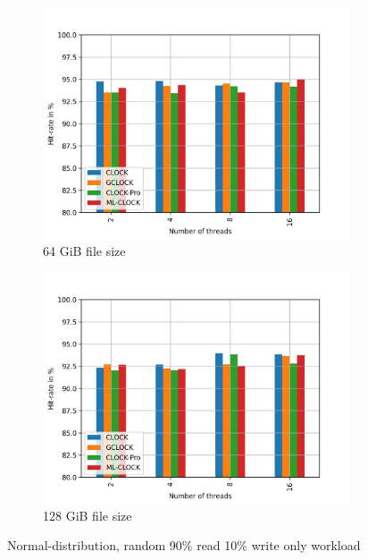 \documentclass[
	12pt,
	a4paper,
	abstract,
	bibliography=totoc,
	chapterprefix,
	headings=openright,
	numbers=endperiod,
	parskip=half,
	twoside,
]{scrreprt}
\begin{document}
\begin{figure}[H]
\begin{subfigure}{0.4\textwidth}
		\includegraphics[width=\textwidth]{multi_64_gb_rw_90to10_normal.jpg}		
		\caption{64 GiB file size}
		\label{fig:rw_90to10 64 normal}
	\end{subfigure}
	\hfill
	\begin{subfigure}{0.4\textwidth}
		\includegraphics[width=\textwidth]{multi_128_gb_rw_90to10_normal.jpg}		
		\caption{128 GiB file size}
		\label{fig:rw_90to10 128 normal}
	\end{subfigure}
	\caption{Normal-distribution, random 90\% read 10\% write only workload}
	\label{fig:multi normal rw_90to10}
\end{figure}
\end{document}
